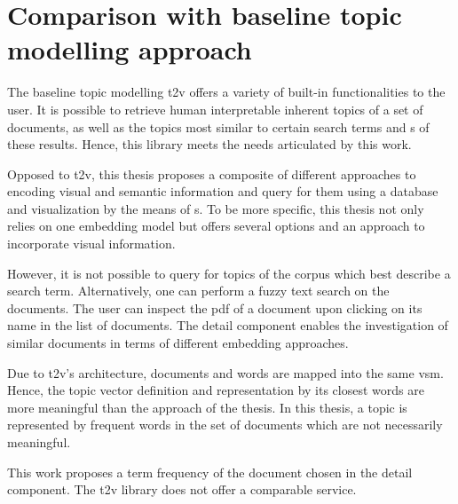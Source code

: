 \section{Comparison with baseline topic modelling approach}\label{sec:evaluation-top-model-app}

The baseline topic modelling \ac{t2v} offers a variety of built-in functionalities to the user.
It is possible to retrieve human interpretable inherent topics of a set of documents, 
as well as the topics most similar to certain search terms 
and \wordcloud{}s of these results.
Hence, this library meets the needs articulated by this work.

Opposed to \ac{t2v}, this thesis proposes a composite of different approaches to encoding visual and semantic information 
and query for them using a database and visualization by the means of \wordcloud{}s.
To be more specific, this thesis not only relies on one embedding model but offers several options and an approach to incorporate visual information.

However, it is not possible to query for topics of the corpus which best describe a search term.
Alternatively, one can perform a fuzzy text search on the documents.
The user can inspect the \ac{pdf} of a document upon clicking on its name in the list of documents.
The detail component enables the investigation of similar documents in terms of different embedding approaches.

Due to \ac{t2v}'s architecture, documents and words are mapped into the same \ac{vsm}.
Hence, the topic vector definition and representation by its closest words are more meaningful than the approach of the thesis. 
In this thesis, a topic is represented by frequent words in the set of documents which are not necessarily meaningful. 

This work proposes a term frequency of the document chosen in the detail component.
The \ac{t2v} library does not offer a comparable service.